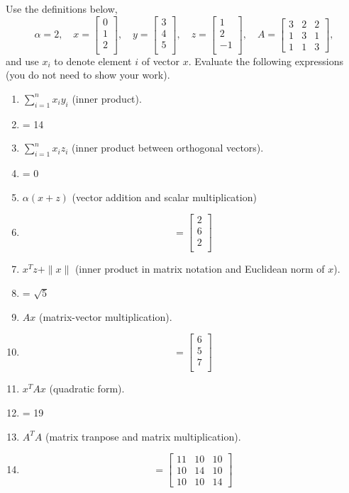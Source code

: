 \documentclass{article}
\def\blu#1{{\color{blu}#1}}
\def\gre#1{{\color{gre}#1}}
\def\norm#1{\|#1\|}
\def\enum#1{\begin{enumerate}#1\end{enumerate}}
\begin{document}
Use the definitions below,
\[
\alpha = 2,\quad
x = \left[\begin{array}{c}
0\\
1\\
2\\
\end{array}\right], \quad
y = \left[\begin{array}{c}
3\\
4\\
5\\
\end{array}\right],\quad
z = \left[\begin{array}{c}
1\\
2\\
-1\\
\end{array}\right],\quad
A = \left[\begin{array}{ccc}
3 & 2 & 2\\
1 & 3 & 1\\
1 & 1 & 3
\end{array}\right],
\]
and use $x_i$ to denote element $i$ of vector $x$.
\blu{Evaluate the following expressions} (you do not need to show your work).
\enum{
\item $\sum_{i=1}^n x_iy_i$ (inner product).
\item[] \gre{= 14}
\item $\sum_{i=1}^n x_iz_i$ (inner product between orthogonal vectors).
\item[] \gre{= 0}
\item $\alpha(x+z)$ (vector addition and scalar multiplication)
\item[] \gre{\[
= \left[ {\begin{array}{c}
2 \\
6 \\
2 \\
\end{array} } \right]
\]}
\item $x^Tz + \norm{x}$ (inner product in matrix notation and Euclidean norm of $x$).
\item[] \gre{= $\sqrt{5}$}
\item $Ax$ (matrix-vector multiplication).
\item[] \gre{\[
= \left[ {\begin{array}{c}
6 \\
5 \\
7 \\
\end{array} } \right]
\]}
\item $x^TAx$ (quadratic form).
\item[] \gre{= 19}
\item $A^TA$ (matrix tranpose and matrix multiplication).
\item[] \gre{\[
= \left[\begin{array}{ccc}
11 & 10 & 10\\
10 & 14 & 10\\
10 & 10 & 14
\end{array}\right]
\]}
}
\end{document}
